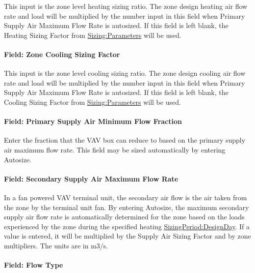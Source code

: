 This input is the zone level heating sizing ratio. The zone design heating air flow rate and load will be multiplied by the number input in this field when Primary Supply Air Maximum Flow Rate is autosized. If this field is left blank, the Heating Sizing Factor from \hyperref[sizingparameters]{Sizing:Parameters} will be used.

\paragraph{Field: Zone Cooling Sizing Factor}\label{field-zone-cooling-sizing-factor-7}

This input is the zone level cooling sizing ratio. The zone design cooling air flow rate and load will be multiplied by the number input in this field when Primary Supply Air Maximum Flow Rate is autosized. If this field is left blank, the Cooling Sizing Factor from \hyperref[sizingparameters]{Sizing:Parameters} will be used.

\paragraph{Field: Primary Supply Air Minimum Flow Fraction}\label{field-primary-supply-air-minimum-flow-fraction}

Enter the fraction that the VAV box can reduce to based on the primary supply air maximum flow rate. This field may be sized automatically by entering Autosize.

\paragraph{Field: Secondary Supply Air Maximum Flow Rate}\label{field-secondary-supply-air-maximum-flow-rate}

In a fan powered VAV terminal unit, the secondary air flow is the air taken from the zone by the terminal unit fan. By entering Autosize, the maximum secondary supply air flow rate is automatically determined for the zone based on the loads experienced by the zone during the specified heating \hyperref[sizingperioddesignday]{SizingPeriod:DesignDay}. If a value is entered, it will be multiplied by the Supply Air Sizing Factor and by zone multipliers. The units are in m3/s.

\paragraph{Field: Flow Type}\label{field-flow-type}

